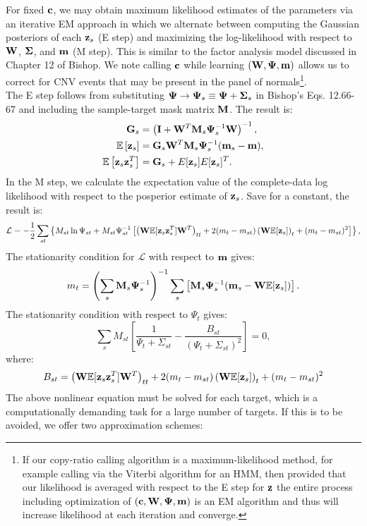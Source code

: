 \documentclass[nofootinbib,amssymb,amsmath]{revtex4}
\newcommand{\vI}{{\bf I}}
\newcommand{\vc}{{\bf c}}
\newcommand{\vz}{{\bf z}}
\newcommand{\vm}{{\bf m}}
\newcommand{\vG}{{\bf G}}
\newcommand{\vM}{{\bf M}}
\newcommand{\vW}{{\bf W}}
\newcommand{\vPsi}{{\bf \Psi}}
\newcommand{\vSigma}{{\bf \Sigma}}
\newcommand{\EE}{\mathbb{E}}
\begin{document}
\noindent {\bf EM algorithm for obtaing MLE of $(\vW, \vPsi, \vm)$:} For fixed $\vc$, we may obtain maximum likelihood estimates of the parameters via an iterative EM approach in which we alternate between computing the Gaussian posteriors of each $\vz_s$ (E step) and maximizing the log-likelihood with respect to $\vW$, $\vSigma$, and $\vm$ (M step). This is similar to the factor analysis model discussed in Chapter 12 of Bishop. We note calling $\vc$ while learning $(\vW, \vPsi, \vm)$ allows us to correct for CNV events that may be present in the panel of normals\footnote{If our copy-ratio calling algorithm is a maximum-likelihood method, for example calling via the Viterbi algorithm for an HMM, then provided that our likelihood is averaged with respect to the E step for $\vz$ the entire process including optimization of $(\vc, \vW, \vPsi, \vm)$ is an EM algorithm and thus will increase likelihood at each iteration and converge.}.\\

The E step follows from substituting $\vPsi \rightarrow \vPsi_s \equiv  \vPsi + \vSigma_s$ in Bishop's Eqs. 12.66-67 and including the sample-target mask matrix $\vM$. The result is:
\begin{align}
\vG_s &= \left( \vI + \vW^T \vM_s \vPsi_s^{-1} \vW \right)^{-1}, \nonumber\\
\EE \left[ \vz_s \right] &= \vG_s \vW^T \vM_s \vPsi_s^{-1} (\vm_s - \vm), \nonumber\\
\EE \left[ \vz_s \vz_s^T \right] &= \vG_s + E[\vz_s] E[\vz_s]^T.
\end{align}
%
In the M step, we calculate the expectation value of the complete-data log likelihood with respect to the posperior estimate of $\vz_s$. Save for a constant, the result is:
%
\begin{equation}
\mathcal{L} = -\frac{1}{2} \sum_{st} \left\{ M_{st} \ln \Psi_{st} + M_{st} \Psi_{st}^{-1} \left[  \left( \vW \EE[\vz_s \vz_s^T] \vW^T \right)_{tt} +2 (m_t - m_{st}) \left( \vW \EE[\vz_s] \right)_t + (m_t - m_{st})^2 \right] \right\},
\end{equation}
%
The stationarity condition for $\mathcal{L}$ with respect to $\vm$ gives: 
\begin{align}
m_t = \left(\sum_s \vM_s \vPsi_{s}^{-1} \right)^{-1} \sum_s \left[ \vM_s \vPsi_{s}^{-1}  (\vm_{s}  - \vW  \EE[\vz_{s}] ) \right].
\end{align}
The stationarity condition with respect to $\Psi_t$ gives:
\begin{equation}\label{eq:psi_stationarity}
\sum_s M_{st}\left[\frac{1}{\Psi_t + \Sigma_{st}} - \frac{B_{st}}{(\Psi_t + \Sigma_{st})^2} \right] = 0,
\end{equation}
where:
\begin{equation}
B_{st} = \left( \vW \EE[\vz_s \vz_s^T] \vW^T \right)_{tt} +2 (m_t - m_{st}) \left( \vW \EE[\vz_s] \right)_t + (m_t - m_{st})^2
\end{equation}
The above nonlinear equation must be solved for each target, which is a computationally demanding task for a large number of targets. If this is to be avoided, we offer two approximation schemes:\\
\end{document}
